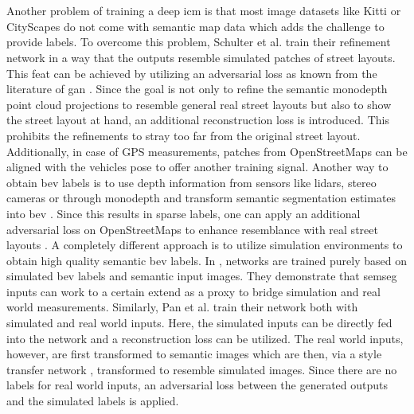 \\\\ 
Another problem of training a deep \gls{icm} is that most image datasets like Kitti \cite{geiger2013vision} or CityScapes \cite{cordts2016cityscapes} do not come with semantic map data which adds the challenge to provide labels. To overcome this problem, Schulter et al. \cite{schulter2018learning} train their refinement network in a way that the outputs resemble simulated patches of street layouts. This feat can be achieved by utilizing an adversarial loss as known from the literature of \gls{gan} \cite{goodfellow2020generative}. Since the goal is not only to refine the semantic \gls{monodepth} point cloud projections to resemble general real street layouts but also to show the street layout at hand, an additional reconstruction loss is introduced. This prohibits the refinements to stray too far from the original street layout. Additionally, in case of GPS measurements, patches from OpenStreetMaps \cite{haklay2008openstreetmap} can be aligned with the vehicles pose to offer another training signal. Another way to obtain \gls{bev} labels is to use depth information from sensors like lidars, stereo cameras or through \gls{monodepth} and transform semantic segmentation estimates into \gls{bev} \cite{mani2020monolayout,lu2019monocular}. Since this results in sparse labels, one can apply an additional adversarial loss on OpenStreetMaps to enhance resemblance with real street layouts \cite{mani2020monolayout}. A completely different approach is to utilize simulation environments to obtain high quality semantic \gls{bev} labels. In \cite{reiher2020sim2real}, networks are trained purely based on simulated \gls{bev} labels and semantic input images. They demonstrate that \gls{semseg} inputs can work to a certain extend as a proxy to bridge simulation and real world measurements. Similarly, Pan et al. \cite{pan2020cross} train their network both with simulated and real world inputs. Here, the simulated inputs can be directly fed into the network and a reconstruction loss can be utilized. The real world inputs, however, are first transformed to semantic images which are then, via a style transfer network \cite{jing2019neural}, transformed to resemble simulated images. Since there are no labels for real world inputs, an adversarial loss between the generated outputs and the simulated labels is applied.
\\\\
